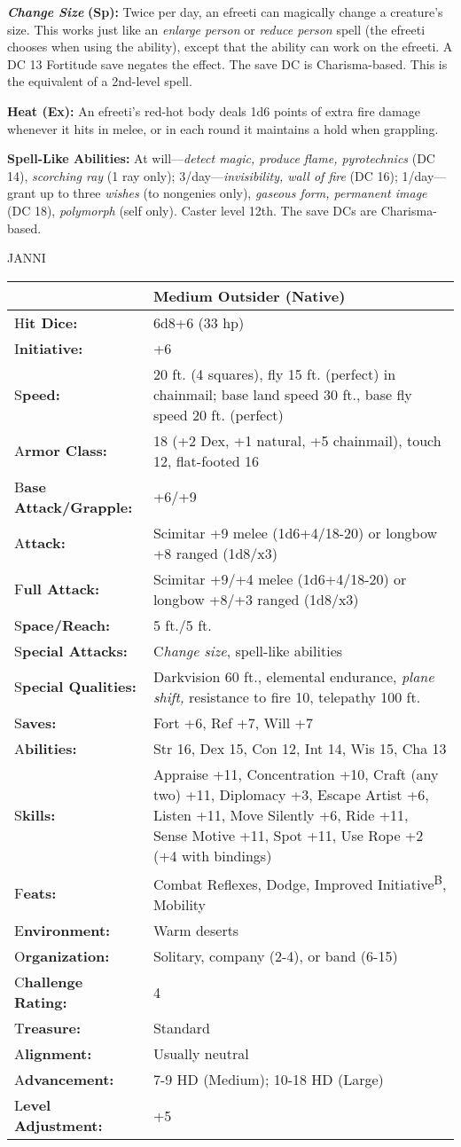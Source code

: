 \documentclass{article}
\begin{document}
\textit{\textbf{Change Size }}\textbf{(Sp): }Twice per day, an efreeti can magically 
change a creature's size. This works just like an \textit{enlarge person }or \textit{reduce 
person }spell (the efreeti chooses when using the ability), except that the ability 
can work on the efreeti. A DC 13 Fortitude save negates the effect. The save DC 
is Charisma-based. This is the equivalent of a 2nd-level spell.

\textbf{Heat (Ex):} An efreeti's red-hot body deals 1d6 points of extra fire damage 
whenever it hits in melee, or in each round it maintains a hold when grappling.

\textbf{Spell-Like Abilities: }At will---\textit{detect magic, produce flame, pyrotechnics 
}(DC 14), \textit{scorching ray }(1 ray only); 3/day---\textit{invisibility, wall 
of fire }(DC 16); 1/day---grant up to three \textit{wishes }(to nongenies only), 
\textit{gaseous form, permanent image }(DC 18), \textit{polymorph }(self only). 
Caster level 12th. The save DCs are Charisma-based.

JANNI

\begin{tabular}{|>{\raggedright}p{85pt}|>{\raggedright}p{241pt}|}
\hline
  & Medium Outsider (Native)\tabularnewline
\hline
H\textbf{it Dice:} & 6d8+6 (33 hp)\tabularnewline
\hline
I\textbf{nitiative:} & +6\tabularnewline
\hline
S\textbf{peed:} & 20 ft. (4 squares), fly 15 ft. (perfect) in chainmail; base land 
speed 30 ft., base fly speed 20 ft. (perfect)\tabularnewline
\hline
A\textbf{rmor Class:} & 18 (+2 Dex, +1 natural, +5 chainmail), touch 12, flat-footed 
16\tabularnewline
\hline
B\textbf{ase Attack/Grapple:} & +6/+9\tabularnewline
\hline
A\textbf{ttack:} & Scimitar +9 melee (1d6+4/18-20) or longbow +8 ranged (1d8/x3)\tabularnewline
\hline
F\textbf{ull Attack:} & Scimitar +9/+4 melee (1d6+4/18-20) or longbow +8/+3 ranged 
(1d8/x3)\tabularnewline
\hline
S\textbf{pace/Reach:} & 5 ft./5 ft.\tabularnewline
\hline
S\textbf{pecial Attacks:} & C\textit{hange size}, spell-like abilities\tabularnewline
\hline
S\textbf{pecial Qualities:} & Darkvision 60 ft., elemental endurance, \textit{plane 
shift, }resistance to fire 10, telepathy 100 ft.\tabularnewline
\hline
S\textbf{aves:} & Fort +6, Ref +7, Will +7\tabularnewline
\hline
A\textbf{bilities:} & Str 16, Dex 15, Con 12, Int 14, Wis 15, Cha 13\tabularnewline
\hline
S\textbf{kills:} & Appraise +11, Concentration +10, Craft (any two) +11, Diplomacy 
+3, Escape Artist +6, Listen +11, Move Silently +6, Ride +11, Sense Motive +11, 
Spot +11, Use Rope +2 (+4 with bindings)\tabularnewline
\hline
F\textbf{eats:} & Combat Reflexes, Dodge, Improved Initiative\textsuperscript{B}, 
Mobility\tabularnewline
\hline
E\textbf{nvironment:} & Warm deserts\tabularnewline
\hline
O\textbf{rganization:} & Solitary, company (2-4), or band (6-15)\tabularnewline
\hline
C\textbf{hallenge Rating:} & 4\tabularnewline
\hline
T\textbf{reasure:} & Standard\tabularnewline
\hline
A\textbf{lignment:} & Usually neutral\tabularnewline
\hline
A\textbf{dvancement:} & 7-9 HD (Medium); 10-18 HD (Large)\tabularnewline
\hline
L\textbf{evel Adjustment:} & +5\tabularnewline
\hline
\end{tabular}
\end{document}
